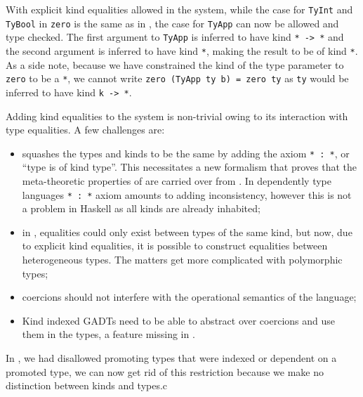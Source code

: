 \documentclass[manuscript,screen,nonacm]{acmart}
\begin{document}
With explicit kind equalities allowed in the system, while the case for \lstinline{TyInt} and \lstinline{TyBool} in \lstinline{zero} is the same as in \SFC, the case for \lstinline{TyApp} can now be allowed and type checked. The first argument to \lstinline{TyApp} is inferred to have kind \lstinline{* -> *} and the second argument is inferred to have kind \lstinline{*}, making the result to be of kind \lstinline{*}. As a side note, because we have constrained the kind of the type parameter to \lstinline{zero} to be a \lstinline{*}, we cannot write \lstinline{zero (TyApp ty b) = zero ty} as \lstinline{ty} would be inferred to have kind \lstinline{k -> *}.

Adding kind equalities to the system is non-trivial owing to its interaction with type equalities. A few challenges are:
\begin{itemize}
 \item \SFK squashes the types and kinds to be the same by adding the axiom \lstinline{* : *}, or ``type is of kind type''. This necessitates a new formalism that proves that the meta-theoretic properties of \SFK are carried over from \SFC. In dependently type languages \lstinline{* : *} axiom amounts to adding inconsistency, however this is not a problem in Haskell as all kinds are already inhabited;
 \item in \SFC, equalities could only exist between types of the same kind, but now, due to explicit kind equalities, it is possible to construct equalities between heterogeneous types. The matters get more complicated with polymorphic types;
 \item coercions should not interfere with the operational semantics of the language;
 \item Kind indexed GADTs need to be able to abstract over coercions and use them in the types, a feature missing in \SFC.
\end{itemize}

In \SFP, we had disallowed promoting types that were indexed or dependent on a promoted type, we can now get rid of this restriction because we make no distinction between kinds and types.c
\end{document}
